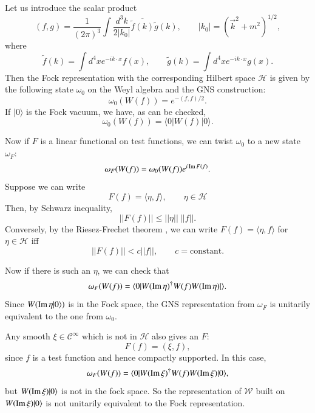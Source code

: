 Let us introduce the scalar product
$$
(f,g)=\frac{1}{(2\pi)^{3}}\int \dfrac{d^{3}k}{2|k_{0}|}\overline{\widetilde{f}(k)}\widetilde{g}(k),\qquad |k_{0}|=(\overrightarrow{k}^{2}+m^{2})^{1/2},
$$
where
\begin{equation}
\widetilde{f}(k)=\int d^{4}xe^{-ik\cdot x}f(x),\qquad \widetilde{g}(k)=\int d^{4}xe^{-ik\cdot x}g(x).\label{chap4-eq2.17}
\end{equation}
Then the Fock representation with the corresponding Hilbert space $\mathcal{H}$ is given by the following state $\omega_{0}$ on the Weyl algebra and the GNS construction:
\begin{equation}
\omega_{0}(W(f))=e^{-(f,f)/2}.\label{chap4-eq2.18}
\end{equation}
If $|0\rangle$ is the Fock vacuum, we have, as can be checked,
\begin{equation}
\omega_{0}(W(f))=\langle 0|W (f)|0\rangle.\label{chap4-eq2.19}
\end{equation}

Now if $F$ is a linear functional on test functions, we can twist $\omega_{0}$ to a new state $\omega_{F}$:
\begin{equation}
\omega_{F}(W(f))=\omega_{0}(W(f))e^{i \operatorname{\mathrm{Im}} F(f)}.\label{chap4-eq2.20} 
\end{equation}
Suppose we can write
\begin{equation}
F(f) = \langle\eta, f\rangle, \qquad \eta \in \mathcal{H} \label{chap4-eq2.21}
\end{equation}
Then, by Schwarz inequality,
\begin{equation}
|| F(f) || \leq ||\eta || ~ || f ||.\label{chap4-eq2.22}
\end{equation}
Conversely, by the Riesez-Frechet theorem \cite{chap4-key9}, we can write $F(f)= \langle \eta, f\rangle$ for $\eta \in \mathcal{H}$ iff
\begin{equation}
|| F(f) || < c || f||, \qquad c= \text{constant}. \label{chap4-eq2.23}
\end{equation}

Now if there is such an $\eta$, we can check that
\begin{equation}
\omega_F (W (f))= \langle 0| W (\operatorname{\mathrm{Im}} \eta)^\dagger W (f)W (\operatorname{\mathrm{Im}} \eta)|\rangle. \label{chap4-eq2-24}
\end{equation}
Since $W(\operatorname{\mathrm{Im}} \eta | 0 \rangle)$ is in the Fock space, the GNS representation from $\omega_F$ is unitarily equivalent to the one from $\omega_0$.

Any smooth $\xi \in \mathcal{C}^\infty$ which is not in $\mathcal{H}$ also gives an $F$:
\begin{equation}
  F(f)= (\xi, f), \label{chap4-eq2.25}
\end{equation}
since $f$ is a test function and hence compactly supported. In this case,
\begin{equation}
\omega_F (W(f))= \langle 0| W (\operatorname{\mathrm{Im}} \xi)^\dagger W (f)W (\operatorname{\mathrm{Im}} \xi)|0\rangle, \label{chap4-eq2.26}
\end{equation}
but $W (\operatorname{\mathrm{Im}} \xi)|0 \rangle$ is not in the fock space. So the representation of $\mathcal{W}$ built on $W (\operatorname{\mathrm{Im}} \xi)|0 \rangle$ is not unitarily equivalent to the Fock representation.

